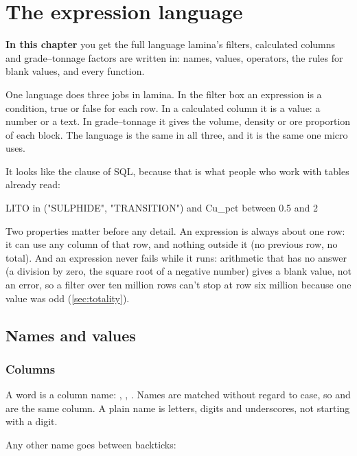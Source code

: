 \chapter{The expression language}\label{ch:expr}
\begin{goals}
\textbf{In this chapter} you get the full language lamina's filters, calculated columns and grade–tonnage
factors are written in: names, values, operators, the rules for blank values, and every function.
\end{goals}

One language does three jobs in lamina. In the filter box an expression is a condition, true or false
for each row. In a calculated column it is a value: a number or a text. In grade–tonnage it gives the
volume, density or ore proportion of each block. The language is the same in all three, and it is the
same one micro uses.

It looks like the  clause of SQL, because that is what people who work with tables already
read:

\begin{codeblock}
LITO in ("SULPHIDE", "TRANSITION") and Cu_pct between 0.5 and 2
\end{codeblock}

Two properties matter before any detail. An expression is always about one row: it can use any column
of that row, and nothing outside it (no previous row, no total). And an expression never fails while it
runs: arithmetic that has no answer (a division by zero, the square root of a negative number) gives a
blank value, not an error, so a filter over ten million rows can't stop at row six million because one
value was odd (\cref{sec:totality}).

\section{Names and values}\label{sec:names}

\subsection{Columns}

A word is a column name: , , . Names are matched without regard to
case, so  and  are the same column. A plain name is letters, digits and
underscores, not starting with a digit.

Any other name goes between backticks:

